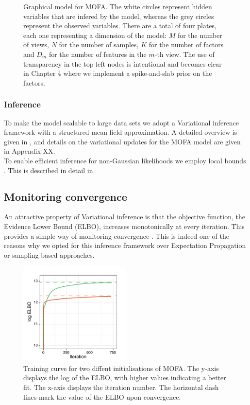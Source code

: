 \begin{figure}[H]
	\centering
	
	\caption{Graphical model for MOFA. The white circles represent hidden variables that are infered by the model, whereas the grey circles represent the observed variables. There are a total of four plates, each one representing a dimension of the model: $M$ for the number of views, $N$ for the number of samples, $K$ for the number of factors and $D_m$ for the number of features in the $m$-th view. The use of transparency in the top left nodes is intentional and becomes clear in Chapter 4 where we implement a spike-and-slab prior on the factors.}
	\label{fig:MOFA_graphical_model}
\end{figure}

\subsubsection{Inference}
To make the model scalable to large data sets we adopt a Variational inference framework with a structured mean field approximation. A detailed overview is given in , and details on the variational updates for the MOFA model are given in Appendix XX.\\
To enable efficient inference for non-Gaussian likelihoods we employ local bounds \cite{Jaakkola2000,Seeger2012}. This is described in detail in 

\subsection{Monitoring convergence}
An attractive property of Variational inference is that the objective function, the Evidence Lower Bound (ELBO), increases monotonically at every iteration. This provides a simple way of monitoring convergence . This is indeed one of the reasons why we opted for this inference framework over Expectation Propagation or sampling-based approaches.

 \begin{figure}[H]
	\centering 	
	\includegraphics[width=0.5\textwidth]{elbo_convergence}
	\caption{Training curve for two diffent initialisations of MOFA. The y-axis displays the log of the ELBO, with higher values indicating a better fit. The x-axis displays the iteration number. The horizontal dash lines mark the value of the ELBO upon convergence. }
	\label{fig:elbo_convergence}
\end{figure}

